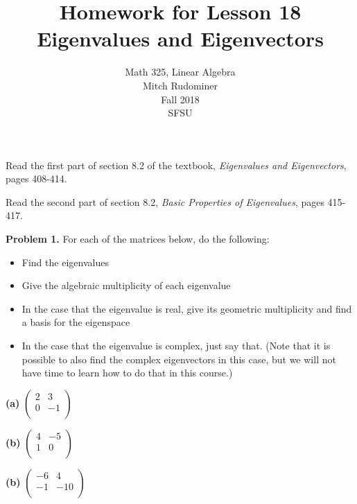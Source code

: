 \documentclass[oneside,12pt]{amsart}
\begin{document}
\title{Homework for Lesson 18 \\ Eigenvalues and Eigenvectors}
\author{Math 325, Linear Algebra \\ Mitch Rudominer \\ Fall 2018 \\ SFSU }
\date{}

\maketitle

\bigskip

Read the first part of section 8.2 of the textbook,
 \emph{Eigenvalues and Eigenvectors}, pages 408-414.

 Read the second part of section 8.2, \emph{Basic Properties of Eigenvalues},
 pages 415-417.

\bigskip

\textbf{Problem 1.} For each of the matrices below, do the following:
\begin{itemize}
\item Find the eigenvalues
\item Give the algebraic multiplicity of each eigenvalue
\item In the case that the eigenvalue is real, give its geometric multiplicity
and find a basis for the eigenspace
\item In the case that the eigenvalue is complex, just say that. (Note
that it is possible to also find the complex eigenvectors in this case, but
we will not have time to learn how to do that in this course.)
\end{itemize}

\bigskip

\textbf{(a)}
$
\begin{pmatrix}
2 & 3 \\
0 & -1 \\
\end{pmatrix}
$

\bigskip
\bigskip
\bigskip

\textbf{(b)}
$
\begin{pmatrix}
4 & -5 \\
1 & 0 \\
\end{pmatrix}
$


\bigskip
\bigskip
\bigskip

\textbf{(b)}
$
\begin{pmatrix}
-6 & 4 \\
-1 & -10 \\
\end{pmatrix}
$
\end{document}
